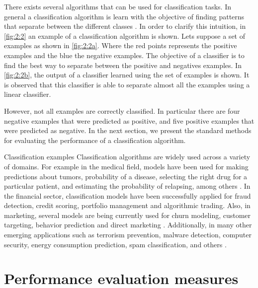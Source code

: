 There exists several algorithms that can be used for classification tasks. In general a 
classification algorithm is learn with the objective of finding patterns that separate between the 
different classes \citep{Hastie2009}. In order to clarify this intuition, in \figurename{ 
\ref{fig:2:2}} an example of a classification algorithm is shown. Lets suppose a set of examples as 
shown in \figurename{ \ref{fig:2:2a}}.  Where the red points represents the positive examples and 
the blue the negative examples. The objective of a classifier is to find the best way to separate 
between the positive and negatives examples. In \figurename{ \ref{fig:2:2b}}, the output of a 
classifier learned using the set of examples is shown. It is observed that this classifier is able 
to separate almost all the examples using a linear classifier. 

However, not all examples are correctly classified. In particular there are four negative examples 
that were predicted as positive, and five positive examples that were predicted as negative. In the 
next section, we present the standard methods for evaluating the performance of a classification 
algorithm.

\begin{remark}{Classification examples}
Classification algorithms are widely used across a variety of domains. For example in the 
medical field, models have been used for making predictions about tumors, probability 
of a disease, selecting the right drug for a particular patient, and estimating the probability of 
relapsing, among others \citep{Herland2014}. In the financial sector, classification models have 
been successfully applied for fraud detection, credit scoring, portfolio management and algorithmic 
trading. Also, in marketing, several models are being currently used for churn modeling, customer 
targeting, behavior prediction and direct marketing \citep{Baesens2014}. Additionally, in many 
other emerging applications such as terrorism prevention, malware detection, computer security, 
energy consumption prediction, spam classification, and others \citep{Kriegel2007}.
\end{remark}


\section{Performance evaluation measures}
\label{sec:2:measures}

